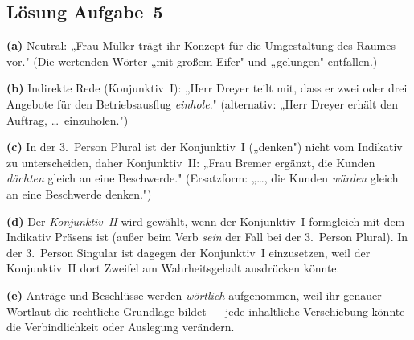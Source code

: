 \documentclass[11pt, a4paper]{article}
\begin{document}
\subsection*{Lösung Aufgabe~5}
\begin{loesung}
\textbf{(a)} Neutral: „Frau Müller trägt ihr Konzept für die Umgestaltung des Raumes vor."
(Die wertenden Wörter „mit großem Eifer" und „gelungen" entfallen.)

\textbf{(b)} Indirekte Rede (Konjunktiv~I): „Herr Dreyer teilt mit, dass er zwei oder drei
Angebote für den Betriebsausflug \emph{einhole}." (alternativ: „Herr Dreyer erhält den
Auftrag, \dots\ einzuholen.")

\textbf{(c)} In der 3.\ Person Plural ist der Konjunktiv~I („denken") nicht vom Indikativ
zu unterscheiden, daher Konjunktiv~II: „Frau Bremer ergänzt, die Kunden \emph{dächten}
gleich an eine Beschwerde." (Ersatzform: „\dots, die Kunden \emph{würden} gleich an eine
Beschwerde denken.")

\textbf{(d)} Der \emph{Konjunktiv~II} wird gewählt, wenn der Konjunktiv~I formgleich mit
dem Indikativ Präsens ist (außer beim Verb \emph{sein} der Fall bei der 3.\ Person Plural).
In der 3.\ Person Singular ist dagegen der Konjunktiv~I einzusetzen, weil der Konjunktiv~II
dort Zweifel am Wahrheitsgehalt ausdrücken könnte.

\textbf{(e)} Anträge und Beschlüsse werden \emph{wörtlich} aufgenommen, weil ihr genauer
Wortlaut die rechtliche Grundlage bildet --- jede inhaltliche Verschiebung könnte die
Verbindlichkeit oder Auslegung verändern.
\end{loesung}
\end{document}
